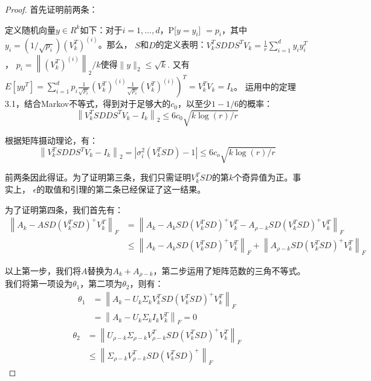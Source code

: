 \documentclass{ctexart}
\begin{document}
    \begin{proof}
        首先证明前两条：

        定义随机向量$y \in R^k$如下：对于$i = 1, \dots, d$，P[$y=y_i$] $= p_i$，其中$y_{i}=(1 / \sqrt{p_{i}})\left(V_{k}^{T}\right)^{(i)}$。那么，
        $S$和$D$的定义表明：$V_{k}^{T} S D D S^{T} V_{k}=\frac{1}{r} \sum_{i=1}^{d} y_{i} y_{i}^{T}$，
        \(p_{i}=\left\|\left(V_{k}^{T}\right)^{(i)}\right\|_{2} / k\)使得\(\|y\|_{2} \leq \sqrt{k}\).
        又有\(\left.E\left[y y^{T}\right]=\sum_{i=1}^{d} p_{i} \frac{1}{\sqrt{p_{i}}}\left(V_{k}^{T}\right)^{(i)} \frac{1}{\sqrt{p_{i}}}\left(V_{k}^{T}\right)^{(i)}\right)^{T}=V_{k}^{T} V_{k}=I_{k}\)。
        运用\cite{rudelson2007sampling}中的定理3.1，结合Markov不等式，得到对于足够大的$c_0$，以至少$1-1/6$的概率：
        $$
        \left\|V_{k}^{T} S D D S^{T} V_{k}-I_{k}\right\|_{2} \leq 6 c_{0} \sqrt{k \log (r) / r}
        $$

        根据矩阵摄动理论\cite{boutsidis2009unsupervised}，有：
        $$
        \left\|V_{k}^{T} S D D S^{T} V_{k}-I_{k}\right\|_{2}=\left|\sigma_{i}^{2}\left(V_{k}^{T} S D\right)-1\right| \leq 6 c_{o} \sqrt{k \log (r) / r}
        $$

        前两条因此得证。为了证明第三条，我们只需证明$V_k^T S D$的第$k$个奇异值为正。事实上，
        $\epsilon$的取值和引理的第二条已经保证了这一结果。

        为了证明第四条，我们首先有：
        $$
        \begin{aligned}\left\|A_{k}-A S D\left(V_{k}^{T} S D\right)^{+} V_{k}^{T}\right\|_{F} &=\left\|A_{k}-A_{k} S D\left(V_{k}^{T} S D\right)^{+} V_{k}^{T}-A_{\rho-k} S D\left(V_{k}^{T} S D\right)^{+} V_{k}^{T}\right\|_{F} \\ & \leq\left\|A_{k}-A_{k} S D\left(V_{k}^{T} S D\right)^{+} V_{k}^{T}\right\|_{F}+\left\|A_{\rho-k} S D\left(V_{k}^{T} S D\right)^{+} V_{k}^{T}\right\|_F \end{aligned}
        $$

        以上第一步，我们将$A$替换为$A_k + A_{\rho - k}$，第二步运用了矩阵范数的三角不等式。我们将第一项设为$\theta_1$，第二项为$\theta_2$，则有：
        $$
        \begin{aligned} \theta_{1} &=\left\|A_{k}-U_{k} \Sigma_{k} V_{k}^{T} S D\left(V_{k}^{T} S D\right)^{+} V_{k}^{T}\right\|_{F} \\ &=\left\|A_{k}-U_{k} \Sigma_{k} I_{k} V_{k}^{T}\right\|_{F}=0 \end{aligned}
        $$
        $$
        \begin{aligned} \theta_{2} &=\left\|U_{\rho-k} \Sigma_{\rho-k} V_{\rho-k}^{T} S D\left(V_{k}^{T} S D\right)^{+} V_{k}^{T}\right\|_{F} \\ & \leq\left\|\Sigma_{\rho-k} V_{\rho-k}^{T} S D\left(V_{k}^{T} S D\right)^{+}\right\|_{F} \end{aligned}
        $$


\end{proof}
\end{document}
